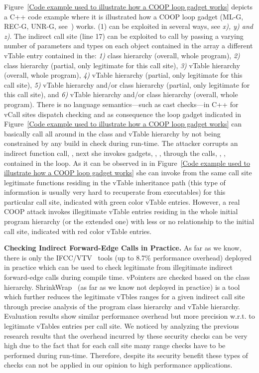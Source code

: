 Figure~\ref{Code example used to illustrate how a COOP loop gadget works}
depicts a C++ code example where it is illustrated how a COOP loop gadget 
(ML-G, REC-G, UNR-G, see~\cite{crane:readactor++}) works.
(1) can be exploited in several ways, see \textit{x), y) and z)}.
The indirect call site (line 17) can be exploited 
to call by passing a varying number of parameters and types
on each object contained in the array a different
vTable entry contained in the:
\textit{1)} class hierarchy (overall, whole program),
\textit{2)} class hierarchy (partial, only legitimate for this call site),
\textit{3)} vTable hierarchy (overall, whole program),
\textit{4)} vTable hierarchy (partial, only legitimate for this call site),
\textit{5)} vTable hierarchy and/or class hierarchy (partial, only legitimate for this call site), and
\textit{6)} vTable hierarchy and/or class hierarchy (overall, whole program).
There is no language semantics---such as cast checks---in C++ for vCall sites dispatch checking and as consequence
the loop gadget indicated in Figure~\ref{Code example used to illustrate how a COOP loop gadget works}
can basically call all around in the class and vTable hierarchy by not being constrained by any build in check during
run-time. The attacker corrupts an indirect function call, , 
next she invokes gadgets,  , , 
through the calls, , , contained in the loop. 
As it can be observed in in Figure~\ref{Code example used to illustrate how a COOP loop gadget works} she 
can invoke from the same call site legitimate functions residing in the vTable inheritance path
(this type of information is usually very hard to recuperate from executables)
for this particular call site, indicated with green color vTable entries. 
However, a real COOP attack invokes illegitimate
vTable entries residing in the whole initial program hierarchy (or the extended one)
with less or no relationship to the initial call site,
indicated with red color vTable entries.

\textbf{Checking Indirect Forward-Edge Calls in Practice.}
\label{C++ Indirect Calls in Practice}
As far as we know, there is only the IFCC/VTV~\cite{vtv:tice} tools (up to 8.7\% performance overhead) deployed in practice
which can be used to check legitimate from illegitimate indirect forward-edge calls during compile time.
vPointers are checked based on the class hierarchy. ShrinkWrap~\cite{haller:shrinkwrap} (as far as we know not deployed in practice)
is a tool which further reduces the legitimate vTbles ranges for a given indirect call site
through precise analysis of the program class hierarchy and vTable hierarchy. 
Evaluation results show similar performance overhead but more precision w.r.t. to legitimate vTables entries per call site.
We noticed by analyzing the previous research results that the overhead incurred by
these security checks can be very high due to the fact that for each call site many range checks 
have to be performed during run-time. Therefore, despite its security benefit these types of
checks can not be applied in our opinion to high performance applications.


